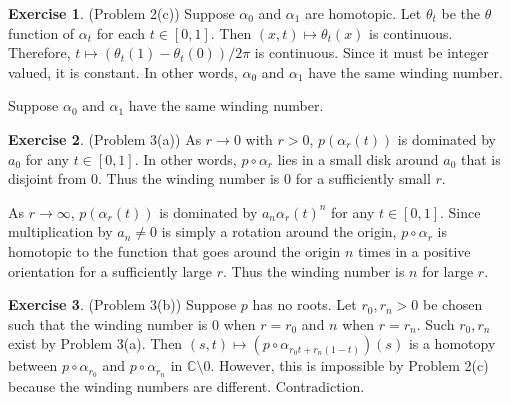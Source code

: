 \documentclass[12pt, psamsfonts]{amsart}
\theoremstyle{definition}
\newtheorem*{exer}{Exercise}
\theoremstyle{remark}
\numberwithin{equation}{section}
\begin{document}
\begin{exer}{(Problem 2(c))}
  Suppose $\alpha_0$ and $\alpha_1$ are homotopic.
  Let $\theta_t$ be the $\theta$ function of $\alpha_t$ for each $t \in [0, 1]$.
  Then $(x, t) \mapsto \theta_t(x)$ is continuous.
  Therefore, $t \mapsto (\theta_t(1) - \theta_t(0)) / 2\pi$ is continuous.
  Since it must be integer valued, it is constant.
  In other words, $\alpha_0$ and $\alpha_1$ have the same winding number.

  Suppose $\alpha_0$ and $\alpha_1$ have the same winding number.

\end{exer}

\begin{exer}{(Problem 3(a))}
  As $r \rightarrow 0$ with $r > 0$, $p(\alpha_r(t))$ is dominated by $a_0$ for any $t \in [0, 1]$.
  In other words, $p \circ \alpha_r$ lies in a small disk around $a_0$ that is disjoint from 0.
  Thus the winding number is 0 for a sufficiently small $r$.

  As $r \rightarrow \infty$, $p(\alpha_r(t))$ is dominated by $a_n\alpha_r(t)^n$ for any $t \in [0, 1]$.
  Since multiplication by $a_n \ne 0$ is simply a rotation around the origin, $p \circ \alpha_r$ is homotopic to the function that goes around the origin $n$ times in a positive orientation for a sufficiently large $r$.
  Thus the winding number is $n$ for large $r$.
\end{exer}

\begin{exer}{(Problem 3(b))}
  Suppose $p$ has no roots.
  Let $r_0, r_n > 0$ be chosen such that the winding number is 0 when $r = r_0$ and $n$ when $r = r_n$.
  Such $r_0, r_n$ exist by Problem 3(a).
  Then $(s, t) \mapsto (p \circ \alpha_{r_0t + r_n(1 - t)})(s)$ is a homotopy between $p \circ \alpha_{r_0}$ and $p \circ \alpha_{r_n}$ in $\mathbb{C} \setminus 0$.
  However, this is impossible by Problem 2(c) because the winding numbers are different.
  Contradiction.
\end{exer}
\end{document}

